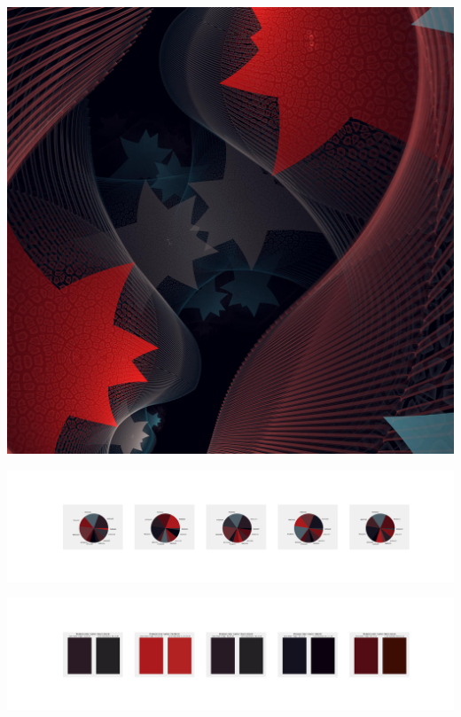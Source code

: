 \documentclass[11pt]{article}
\begin{document}
\begin{landscape}
    \begin{center}
    \includegraphics[width=\textwidth]{./nbimg/file (249).jpg}
    \end{center}

    \begin{center}
    \includegraphics[width=250mm]{./nbimg/pie-166.jpg}
    \end{center}

    \begin{center}
    \includegraphics[width=250mm]{./nbimg/peak-166.jpg}
    \end{center}
    


\end{landscape}
\end{document}
